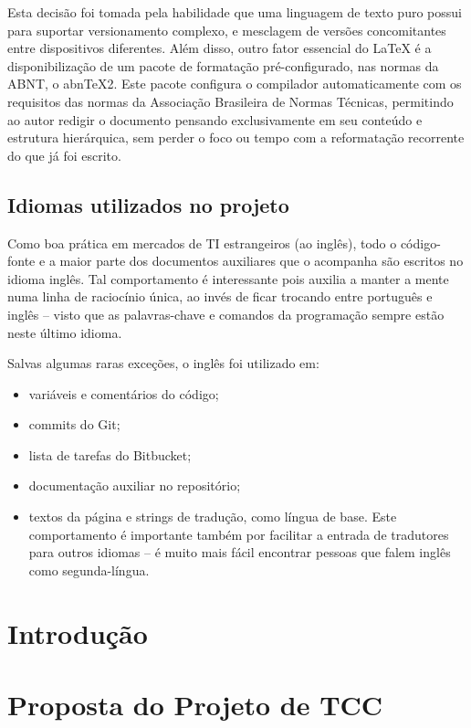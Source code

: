 \documentclass[12pt,a4paper,twoside,hyphens,english,brazil]{abntex2}
\begin{document}
Esta decisão foi tomada pela habilidade que uma linguagem de texto puro possui para suportar versionamento complexo, e mesclagem de versões concomitantes entre dispositivos diferentes. Além disso, outro fator essencial do \LaTeX{} é a disponibilização de um pacote de formatação pré-configurado, nas normas da ABNT, o abn\TeX{}2\cite{abntex2}\cite{abntex2-slides}. Este pacote configura o compilador automaticamente com os requisitos das normas da Associação Brasileira de Normas Técnicas, permitindo ao autor redigir o documento pensando exclusivamente em seu conteúdo e estrutura hierárquica, sem perder o foco ou tempo com a reformatação recorrente do que já foi escrito.

\section*{Idiomas utilizados no projeto}
Como boa prática em mercados de TI estrangeiros (ao inglês), todo o código-fonte e a maior parte dos documentos auxiliares que o acompanha são escritos no idioma inglês. Tal comportamento é interessante pois auxilia a manter a mente numa linha de raciocínio única, ao invés de ficar trocando entre português e inglês -- visto que as palavras-chave e comandos da programação sempre estão neste último idioma.

Salvas algumas raras exceções, o inglês foi utilizado em:
\begin{itemize}
	\item variáveis e comentários do código;
	\item commits do Git;
	\item lista de tarefas do Bitbucket;
	\item documentação auxiliar no repositório;
	\item textos da página e strings de tradução, como língua de base. Este comportamento é importante também por facilitar a entrada de tradutores para outros idiomas -- é muito mais fácil encontrar pessoas que falem inglês como segunda-língua.
\end{itemize}

\textual

\chapter*{Introdução}

\chapter{Proposta do Projeto de TCC}
\end{document}
